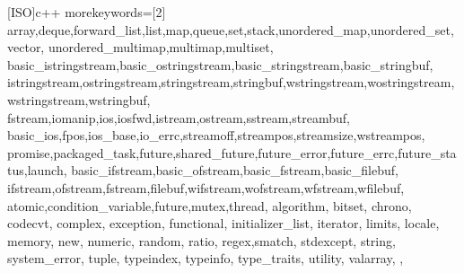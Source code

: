 [ISO]{c++}
{
    morekeywords=[2]{
        array,deque,forward_list,list,map,queue,set,stack,unordered_map,unordered_set,vector,
        unordered_multimap,multimap,multiset,
        basic_istringstream,basic_ostringstream,basic_stringstream,basic_stringbuf,
        istringstream,ostringstream,stringstream,stringbuf,wstringstream,wostringstream,wstringstream,wstringbuf,
        fstream,iomanip,ios,iosfwd,istream,ostream,sstream,streambuf,
        basic_ios,fpos,ios_base,io_errc,streamoff,streampos,streamsize,wstreampos,
        promise,packaged_task,future,shared_future,future_error,future_errc,future_status,launch,
        basic_ifstream,basic_ofstream,basic_fstream,basic_filebuf,
        ifstream,ofstream,fstream,filebuf,wifstream,wofstream,wfstream,wfilebuf,
        atomic,condition_variable,future,mutex,thread,
        algorithm,
        bitset,
        chrono,
        codecvt,
        complex,
        exception,
        functional,
        initializer_list,
        iterator,
        limits,
        locale,
        memory,
        new,
        numeric,
        random,
        ratio,
        regex,smatch,
        stdexcept,
        string,
        system_error,
        tuple,
        typeindex,
        typeinfo,
        type_traits,
        utility,
        valarray,
    },
}

